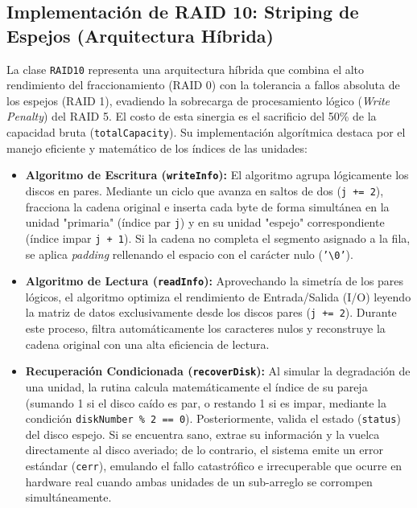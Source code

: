 \documentclass[12pt, a4paper]{article}
\begin{document}
\subsection{Implementación de RAID 10: Striping de Espejos (Arquitectura Híbrida)}

La clase \texttt{RAID10} representa una arquitectura híbrida que combina el alto rendimiento del fraccionamiento (RAID 0) con la tolerancia a fallos absoluta de los espejos (RAID 1), evadiendo la sobrecarga de procesamiento lógico (\textit{Write Penalty}) del RAID 5. El costo de esta sinergia es el sacrificio del 50\% de la capacidad bruta (\texttt{totalCapacity}). Su implementación algorítmica destaca por el manejo eficiente y matemático de los índices de las unidades:

\begin{itemize}
    \item \textbf{Algoritmo de Escritura (\texttt{writeInfo}):} El algoritmo agrupa lógicamente los discos en pares. Mediante un ciclo que avanza en saltos de dos (\texttt{j += 2}), fracciona la cadena original e inserta cada byte de forma simultánea en la unidad "primaria" (índice par \texttt{j}) y en su unidad "espejo" correspondiente (índice impar \texttt{j + 1}). Si la cadena no completa el segmento asignado a la fila, se aplica \textit{padding} rellenando el espacio con el carácter nulo (\texttt{'\textbackslash0'}).
    
    \item \textbf{Algoritmo de Lectura (\texttt{readInfo}):} Aprovechando la simetría de los pares lógicos, el algoritmo optimiza el rendimiento de Entrada/Salida (I/O) leyendo la matriz de datos exclusivamente desde los discos pares (\texttt{j += 2}). Durante este proceso, filtra automáticamente los caracteres nulos y reconstruye la cadena original con una alta eficiencia de lectura.
    
    \item \textbf{Recuperación Condicionada (\texttt{recoverDisk}):} Al simular la degradación de una unidad, la rutina calcula matemáticamente el índice de su pareja (sumando 1 si el disco caído es par, o restando 1 si es impar, mediante la condición \texttt{diskNumber \% 2 == 0}). Posteriormente, valida el estado (\texttt{status}) del disco espejo. Si se encuentra sano, extrae su información y la vuelca directamente al disco averiado; de lo contrario, el sistema emite un error estándar (\texttt{cerr}), emulando el fallo catastrófico e irrecuperable que ocurre en hardware real cuando ambas unidades de un sub-arreglo se corrompen simultáneamente.
\end{itemize}
\end{document}
